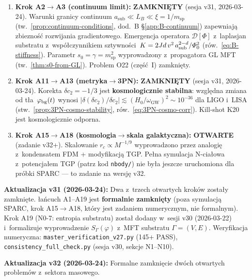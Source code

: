 \begin{enumerate}
  \item \textbf{Krok A2$\to$A3 (continuum limit):}
    \textbf{ZAMKNI\k{E}TY} (sesja v31, 2026-03-24).
    Warunki granicy continuum
    $a_{\mathrm{sub}} \ll L_B \ll \xi = 1/m_{\mathrm{sp}}$
    (tw.~\ref{prop:continuum-conditions}, dod.~B
    \S\ref{app:B-continuum}) zapewniaj\k{a} zbiezno\'s\'c
    rozwijania gradientowego.
    Emergencja operatora $\mathcal{D}[\Phi]$
    z~laplasjan substratu z~wsp\'o\l{}czynnikiem
    sztywno\'sci~$K = 2Jd\,v^2\,a_{\rm sub}^{2-d}/\varPhi_0^2$
    (r\'ow.~\ref{eq:B-stiffness}).
    Parametr $s_0 = \gamma = m_{\mathrm{sp}}^2$ wyprowadzony
    z~propagatora GL MFT (tw.~\ref{thm:s0-from-GL}).
    Problem O22 (cz\k{e}\'s\'c~I) zamkni\k{e}ty.

  \item \textbf{Krok A11$\to$A13 (metryka$\to$3PN):}
    \textbf{ZAMKNI\k{E}TY} (sesja v31, 2026-03-24).
    Korekta $\delta c_2 = -1/3$ jest \textbf{kosmologicznie
    stabilna}: wzgl\k{e}dna zmiana od t\l{}a~$\varphi_{\rm bg}(t)$
    wynosi $|\delta(\delta c_2)/\delta c_2|
    \lesssim (H_0/\omega_{\mathrm{GW}})^2 \sim 10^{-36}$
    dla LIGO i~LISA
    (stw.~\ref{prop:3PN-cosmo-stability},
    r\'ow.~\eqref{eq:3PN-cosmo-corr}).
    Kill-shot K20 jest kosmologicznie odporna.

  \item \textbf{Krok A15$\to$A18 (kosmologia$\to$skala galaktyczna):}
    \textbf{OTWARTE} (zadanie v32+).
    Skalowanie $r_c \propto M^{-1/9}$ wyprowadzono przez analogi\k{e}
    z~kondensatem FDM + modyfikacj\k{a} TGP.
    Pe\l{}na symulacja N-cia\l{}owa z~potencja\l{}em TGP
    (patrz kod \texttt{nbody/}) nie by\l{}a jeszcze uruchomiona
    dla pr\'obki SPARC --- to zadanie na wersj\k{e} v32.
\end{enumerate}

\vspace{6pt}
\noindent
\textbf{Aktualizacja v31 (2026-03-24):} Dwa z~trzech otwartych
krok\'ow zosta\l{}y zamkni\k{e}te. \l{}a\'ncuch A1--A19 jest
\textbf{formalnie zamkni\k{e}ty} (poza symulacj\k{a} SPARC,
krok A15$\to$A18, kt\'ory jest zadaniem numerycznym, nie formalnym).
Krok A19 (N0-7: entropia substratu) zosta\l{} dodany w~sesji v30
(2026-03-22) i~formalizuje wyprowadzenie $S_\Gamma(\varphi)$
z~MFT substratu $\Gamma = (V,E)$.
Weryfikacja numeryczna:
\texttt{master\_verification\_v27.py} (145+ PASS),
\texttt{consistency\_full\_check.py} (sesja v30, sekcje N1--N10).

\vspace{6pt}
\noindent
\textbf{Aktualizacja v32 (2026-03-24):} Formalne zamkni\k{e}cie
dw\'och otwartych problem\'ow z~sektora masowego.

